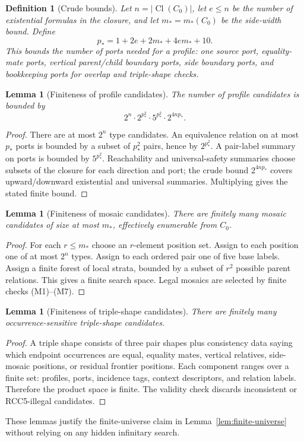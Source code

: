 \documentclass[11pt]{article}
\newtheorem{lemma}[theorem]{Lemma}
\newtheorem{definition}[theorem]{Definition}
\newcommand{\Cl}{\operatorname{Cl}}
\begin{document}
\begin{definition}[Crude bounds]
Let $n=|\Cl(C_0)|$, let $e\le n$ be the number of existential formulas in the closure, and let $m_*=m_*(C_0)$ be the side-width bound.  Define
\[
  p_*=1+2e+2m_*+4e m_*+10.
\]
This bounds the number of ports needed for a profile: one source port, equality-mate ports, vertical parent/child boundary ports, side boundary ports, and bookkeeping ports for overlap and triple-shape checks.
\end{definition}

\begin{lemma}[Finiteness of profile candidates]
The number of profile candidates is bounded by
\[
  2^n\cdot 2^{p_*^2}\cdot 5^{p_*^2}\cdot 2^{4np_*}.
\]
\end{lemma}

\begin{proof}
There are at most $2^n$ type candidates.  An equivalence relation on at most $p_*$ ports is bounded by a subset of $p_*^2$ pairs, hence by $2^{p_*^2}$.  A pair-label summary on ports is bounded by $5^{p_*^2}$.  Reachability and universal-safety summaries choose subsets of the closure for each direction and port; the crude bound $2^{4np_*}$ covers upward/downward existential and universal summaries.  Multiplying gives the stated finite bound.
\end{proof}

\begin{lemma}[Finiteness of mosaic candidates]
There are finitely many mosaic candidates of size at most $m_*$, effectively enumerable from $C_0$.
\end{lemma}

\begin{proof}
For each $r\le m_*$ choose an $r$-element position set.  Assign to each position one of at most $2^n$ types.  Assign to each ordered pair one of five base labels.  Assign a finite forest of local strata, bounded by a subset of $r^2$ possible parent relations.  This gives a finite search space.  Legal mosaics are selected by finite checks (M1)--(M7).
\end{proof}

\begin{lemma}[Finiteness of triple-shape candidates]
There are finitely many occurrence-sensitive triple-shape candidates.
\end{lemma}

\begin{proof}
A triple shape consists of three pair shapes plus consistency data saying which endpoint occurrences are equal, equality mates, vertical relatives, side-mosaic positions, or residual frontier positions.  Each component ranges over a finite set: profiles, ports, incidence tags, context descriptors, and relation labels.  Therefore the product space is finite.  The validity check discards inconsistent or RCC5-illegal candidates.
\end{proof}

These lemmas justify the finite-universe claim in Lemma~\ref{lem:finite-universe} without relying on any hidden infinitary search.
\end{document}
